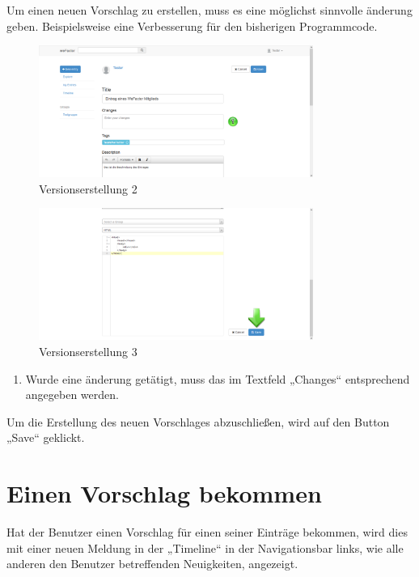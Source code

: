 Um einen neuen Vorschlag zu erstellen, muss es eine möglichst sinnvolle änderung geben. Beispielsweise eine Verbesserung für den bisherigen Programmcode.

\begin{figure}[H]
    \centering
    \includegraphics[width=0.8\textwidth]{Bilder/30.png}
    \caption{Versionserstellung 2}
    \label{fig:versionserstellung2}
\end{figure}
\begin{figure}[H]
    \centering
    \includegraphics[width=0.8\textwidth]{Bilder/31.png}
    \caption{Versionserstellung 3}
    \label{fig:versionserstellung3}
\end{figure}


\begin{enumerate}
\item Wurde eine änderung getätigt, muss das im Textfeld „Changes“ entsprechend angegeben werden.
\end{enumerate}

Um die Erstellung des neuen Vorschlages abzuschließen, wird auf den Button „Save“ geklickt.


\section{Einen Vorschlag bekommen}

Hat der Benutzer einen Vorschlag für einen seiner Einträge bekommen, wird dies mit einer neuen Meldung in der „Timeline“ in der Navigationsbar links, wie alle anderen den Benutzer betreffenden Neuigkeiten, angezeigt.

